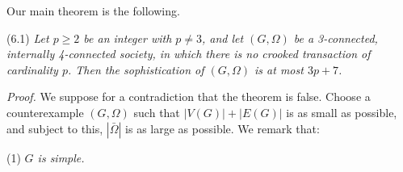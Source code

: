Our main theorem is the following.

\stmt
(6.1) \textit{Let $p \ge 2$ be an integer with $p \ne 3$, and let $(G, \Omega)$ be a 3-connected, internally 4-connected society, in which there is no crooked transaction of cardinality $p$. Then the sophistication of $(G, \Omega)$ is at most $3p + 7$.}

\textit{Proof.} We suppose for a contradiction that the theorem is false. Choose a counterexample $(G, \Omega)$ such that $|V(G)| + |E(G)|$ is as small as possible, and subject to this, $|\bar{\Omega}|$ is as large as possible. We remark that:

\hspace*{12pt}(1) \textit{$G$ is simple.}
